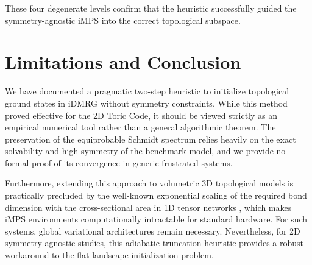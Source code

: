 \documentclass[aps,prb,reprint,superscriptaddress,amsmath,amssymb]{revtex4-2}
\begin{document}
These four degenerate levels confirm that the heuristic successfully guided the symmetry-agnostic iMPS into the correct topological subspace.

\section{\label{sec:conc}Limitations and Conclusion}
We have documented a pragmatic two-step heuristic to initialize topological ground states in iDMRG without symmetry constraints. While this method proved effective for the 2D Toric Code, it should be viewed strictly as an empirical numerical tool rather than a general algorithmic theorem. The preservation of the equiprobable Schmidt spectrum relies heavily on the exact solvability and high symmetry of the benchmark model, and we provide no formal proof of its convergence in generic frustrated systems. 

Furthermore, extending this approach to volumetric 3D topological models is practically precluded by the well-known exponential scaling of the required bond dimension with the cross-sectional area in 1D tensor networks \cite{eisert2010}, which makes iMPS environments computationally intractable for standard hardware. For such systems, global variational architectures remain necessary. Nevertheless, for 2D symmetry-agnostic studies, this adiabatic-truncation heuristic provides a robust workaround to the flat-landscape initialization problem.

\end{document}
